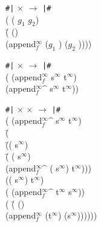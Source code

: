\begin{ZZZZschemedisplay}%
\texttt{\#{}|}  $\times$  $\rightarrow$  \texttt{|\#{}}\\%
( ( $g_1$ $g_2$)\\%
\PRN \HL \=( ()\\%
  \>\PRN \HL (append$^\infty_f$ ($g_1$ ) ($g_2$ ))))
\end{ZZZZschemedisplay}

\begin{ZZZZschemedisplay}%
\texttt{\#{}|}  $\times$  $\rightarrow$  \texttt{|\#{}}\\%
( (append$^\infty_f$ s$^\infty$ t$^\infty$)\\%
\PRN \HL (append$^\infty_f$\textasciicircum {} s$^\infty$ t$^\infty$))
\end{ZZZZschemedisplay}

\begin{ZZZZschemedisplay}%
\texttt{\#{}|}  $\times$  $\times$  $\rightarrow$  \texttt{|\#{}}\\%
( (append$^\infty_f$\textasciicircum {} s$^\infty$ t$^\infty$)\\%
\PRN \HL \=(\\%
  \>\PRN \HL \=(( s$^\infty$)\\%
  \>  \>\PRN \=( ( s$^\infty$)\\%
  \>  \> \>\PRN \HL (append$^\infty_f$\textasciicircum {} ( s$^\infty$) t$^\infty$)))\\%
  \>  \>(( s$^\infty$) t$^\infty$)\\%
  \>  \>( (append$^\infty_f$\textasciicircum {} t$^\infty$ s$^\infty$))\\%
  \>  \>( \=( ()\\%
  \>  \>      \>\PRN \HL (append$^\infty_f$ (t$^\infty$) (s$^\infty$))))))%
\end{ZZZZschemedisplay}

